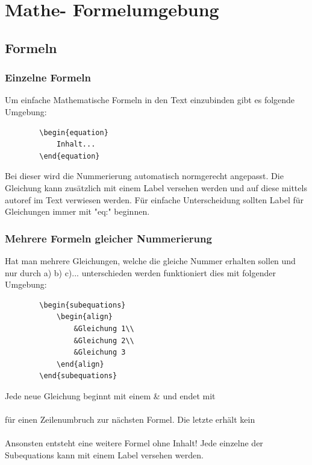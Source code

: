 \documentclass[
12pt,
a4paper,
headings=small,                    %
bibliography=totoc,                %
listof=totoc,                      %
parskip=half*,                     %
]{scrartcl}                        %
\begin{document}
	
	\newpage
	\section{Mathe- Formelumgebung}
	\subsection{Formeln}
	\subsubsection{Einzelne Formeln}
	Um einfache Mathematische Formeln in den Text einzubinden gibt es folgende Umgebung:
	\begin{verbatim}
		\begin{equation}
			Inhalt...
		\end{equation}
	\end{verbatim}
	Bei dieser wird die Nummerierung automatisch normgerecht angepasst. Die Gleichung kann zusätzlich mit einem Label versehen werden und auf diese mittels autoref im Text verwiesen werden. Für einfache Unterscheidung sollten Label für Gleichungen immer mit "eq:" beginnen.
	\subsubsection{Mehrere Formeln gleicher Nummerierung}
	Hat man mehrere Gleichungen, welche die gleiche Nummer erhalten sollen und nur durch a) b) c)... unterschieden werden funktioniert dies mit folgender Umgebung:
	\begin{verbatim}
		\begin{subequations}
			\begin{align}
				&Gleichung 1\\
				&Gleichung 2\\
				&Gleichung 3
			\end{align}
		\end{subequations}
	\end{verbatim}
	Jede neue Gleichung beginnt mit einem \& und endet mit \\\\ für einen Zeilenumbruch zur nächsten Formel. Die letzte erhält kein \\\\ Ansonsten entsteht eine weitere Formel ohne Inhalt! \newline
	Jede einzelne der Subequations kann mit einem Label versehen werden.
\end{document}
